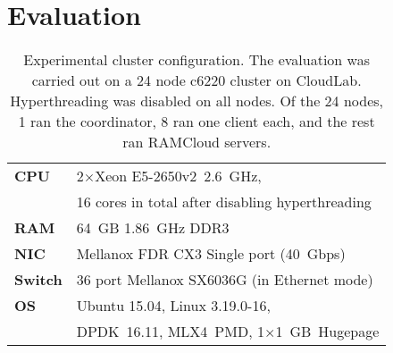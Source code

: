 \section{Evaluation}
\label{sec:reval}

\begin{table}[t]
\centering
\small
\begin{tabular}{p{} p{}}
\toprule
\textbf{CPU} & 2$\times$Xeon E5-2650v2~2.6~GHz,\\
        & 16 cores in total after disabling hyperthreading
\\
\midrule
\textbf{RAM} & 64~GB 1.86~GHz DDR3
\\
\midrule
\textbf{NIC} & Mellanox FDR CX3 Single port (40~Gbps)
\\
\midrule
\textbf{Switch} & 36 port Mellanox SX6036G (in Ethernet mode)
\\
\midrule
\textbf{OS} & Ubuntu 15.04, Linux 3.19.0-16,\\
        & DPDK~16.11, MLX4~PMD, 1$\times$1~GB~Hugepage
\\
\bottomrule
\end{tabular}
\caption{Experimental cluster configuration. The evaluation was
carried out on a 24 node c6220 cluster on CloudLab. Hyperthreading was
disabled on all nodes. Of the 24 nodes, 1
ran the coordinator, 8 ran one client each, and the rest ran
RAMCloud servers.
}
\label{table:exptconfig}
\end{table}

